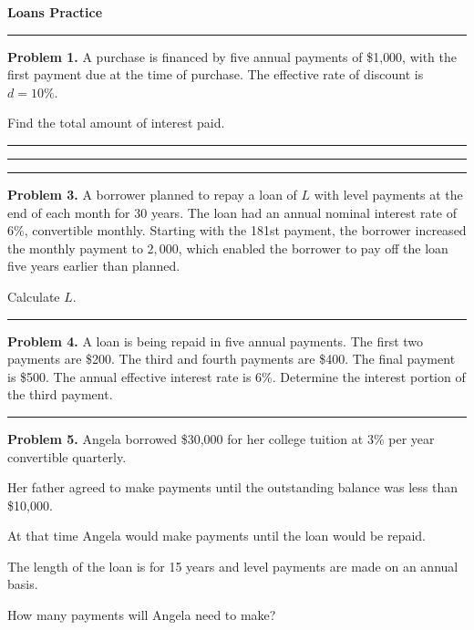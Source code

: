 \documentclass[11pt]{article}
\begin{document}
\begin{center}
    {\Large \textbf{Loans Practice}}\\
\end{center}

\vspace{10pt}

\hrule

\medskip

\textbf{Problem 1.} A purchase is financed by five annual payments of \$1{,}000, with the first payment due at the time of purchase. The effective rate of discount is \(d = 10\%\).

Find the total amount of interest paid.

\medskip
\hrule


\medskip



\medskip
\hrule

\hrule


\textbf{Problem 3.} A borrower planned to repay a loan of \(L\) with level payments at the end of each month for 30 years. The loan had an annual nominal interest rate of \(6\%\), convertible monthly. Starting with the 181st payment, the borrower increased the monthly payment to \(2{,}000\), which enabled the borrower to pay off the loan five years earlier than planned.

Calculate \(L\).

\medskip
\hrule




\textbf{Problem 4.} A loan is being repaid in five annual payments. The first two payments are \$200. The third and fourth payments are \$400. The final payment is \$500. The annual effective interest rate is \(6\%\). Determine the interest portion of the third payment.

\medskip
\hrule

\medskip

\textbf{Problem 5.} Angela borrowed \$30{,}000 for her college tuition at \(3\%\) per year convertible quarterly.

Her father agreed to make payments until the outstanding balance was less than \$10{,}000.

At that time Angela would make payments until the loan would be repaid.

The length of the loan is for 15 years and level payments are made on an annual basis.

How many payments will Angela need to make?

\newpage
\end{document}
